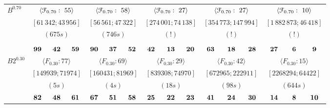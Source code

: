 \documentclass[12pt]{article}
\theoremstyle{thmstyleone}%
\theoremstyle{definition}
\begin{document}
\begin{table}[!ht]
\begin{tabular}{| l | c c c  | c c c | c c c | c c c | c c c | }
\textbf{$B^{0.70}$}& \multicolumn{3}{c|}{$\langle \EuScript{F}_{0.70}:~55 \rangle$ }& \multicolumn{3}{c|}{$\langle \EuScript{F}_{0.70}:~58 \rangle$ }& \multicolumn{3}{c|}{$\langle \EuScript{F}_{0.70}:~27 \rangle$ }& \multicolumn{3}{c|}{$\langle \EuScript{F}_{0.70}:~27 \rangle$ }& \multicolumn{3}{c|}{$\langle \EuScript{F}_{0.70}:~10 \rangle$ } \\
& \multicolumn{3}{c|}{$[61\,342; 43\,956]$}& \multicolumn{3}{c|}{$[56\,561; 47\,322]$}& \multicolumn{3}{c|}{$[274\,001; 74\,138]$}& \multicolumn{3}{c|}{$[354\,773; 147\,994]$}& \multicolumn{3}{c|}{$[1\,882\,873; 46\,418]$} \\
& \multicolumn{3}{c|}{$(675s)$}& \multicolumn{3}{c|}{$(746s)$}& \multicolumn{3}{c|}{$(!)$}& \multicolumn{3}{c|}{$(!)$}& \multicolumn{3}{c|}{$(!)$} \\ \hline

\multicolumn{1}{c}{}& \multicolumn{15}{c}{} \\ \hline
& $\bf 99$ & $\bf 42$ & $\bf 59$ & $\bf 90$ & $\bf 37$ & $\bf 52$ & $\bf 42$ & $\bf 13$ & $\bf 20$ & $\bf 63$ & $\bf 18$ & $\bf 28$ & $\bf 27$ & $\bf 6$ & $\bf 9$ \\

\textbf{$B2^{0.30}$}& \multicolumn{3}{c|}{$\langle F_{0.30}:77 \rangle$ }& \multicolumn{3}{c|}{$\langle F_{0.30}:69 \rangle$ }& \multicolumn{3}{c|}{$\langle F_{0.30}:29 \rangle$ }& \multicolumn{3}{c|}{$\langle F_{0.30}:42 \rangle$ }& \multicolumn{3}{c|}{$\langle F_{0.30}:15 \rangle$ } \\
& \multicolumn{3}{c|}{$[149939; 71974]$}& \multicolumn{3}{c|}{$[160431; 81969]$}& \multicolumn{3}{c|}{$[839308; 74970]$}& \multicolumn{3}{c|}{$[672965; 222911]$}& \multicolumn{3}{c|}{$[2268294; 64422]$} \\
& \multicolumn{3}{c|}{$(5s)$}& \multicolumn{3}{c|}{$(4s)$}& \multicolumn{3}{c|}{$(18s)$}& \multicolumn{3}{c|}{$(98s)$}& \multicolumn{3}{c|}{$(644s)$} \\ \hline
& $\bf 82$ & $\bf 48$ & $\bf 61$ & $\bf 67$ & $\bf 51$ & $\bf 58$ & $\bf 25$ & $\bf 22$ & $\bf 23$ & $\bf 41$ & $\bf 24$ & $\bf 30$ & $\bf 14$ & $\bf 8$ & $\bf 10$ \\


\end{tabular}
\end{table}
\end{document}

